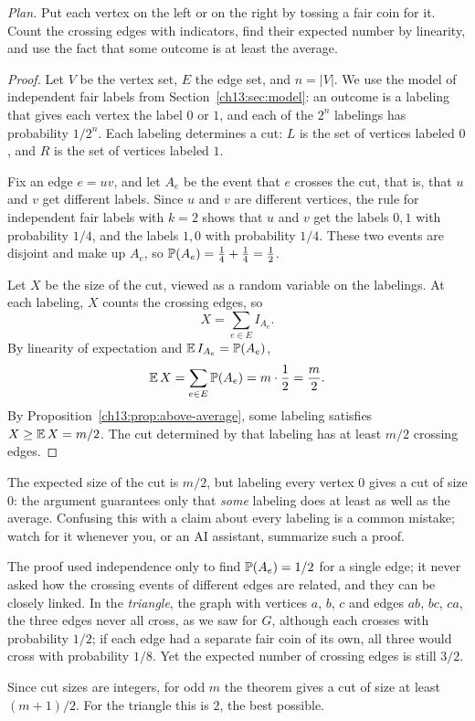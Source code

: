 \noindent\textit{Plan.} Put each vertex on the left or on the right by tossing a fair coin for it. Count the crossing edges with indicators, find their expected number by linearity, and use the fact that some outcome is at least the average.
\begin{proof}
Let $V$ be the vertex set, $E$ the edge set, and $n=|V|$. We use the model of independent fair labels from Section~\ref{ch13:sec:model}: an outcome is a labeling that gives each vertex the label $0$ or $1$, and each of the $2^n$ labelings has probability $1/2^n$. Each labeling determines a cut: $L$ is the set of vertices labeled $0$, and $R$ is the set of vertices labeled $1$.

Fix an edge $e=uv$, and let $A_e$ be the event that $e$ crosses the cut, that is, that $u$ and $v$ get different labels. Since $u$ and $v$ are different vertices, the rule for independent fair labels with $k=2$ shows that $u$ and $v$ get the labels $0,1$ with probability $1/4$, and the labels $1,0$ with probability $1/4$. These two events are disjoint and make up $A_e$, so $\operatorname{\mathbb P}(A_e)=\tfrac14+\tfrac14=\tfrac12$.

Let $X$ be the size of the cut, viewed as a random variable on the labelings. At each labeling, $X$ counts the crossing edges, so
\[
X=\sum_{e\in E}I_{A_e}.
\]
By linearity of expectation and $\operatorname{\mathbb E} I_{A_e}=\operatorname{\mathbb P}(A_e)$,
\[
\operatorname{\mathbb E} X=\sum_{e\in E}\operatorname{\mathbb P}(A_e)=m\cdot\frac12=\frac m2.
\]
By Proposition~\ref{ch13:prop:above-average}, some labeling satisfies $X\ge\operatorname{\mathbb E} X=m/2$. The cut determined by that labeling has at least $m/2$ crossing edges.
\end{proof}

The expected size of the cut is $m/2$, but labeling every vertex $0$ gives a cut of size $0$: the argument guarantees only that \emph{some} labeling does at least as well as the average. Confusing this with a claim about every labeling is a common mistake; watch for it whenever you, or an AI assistant, summarize such a proof.

The proof used independence only to find $\operatorname{\mathbb P}(A_e)=1/2$ for a single edge; it never asked how the crossing events of different edges are related, and they can be closely linked. In the \emph{triangle}, the graph with vertices $a$, $b$, $c$ and edges $ab$, $bc$, $ca$, the three edges never all cross, as we saw for $G$, although each crosses with probability $1/2$; if each edge had a separate fair coin of its own, all three would cross with probability $1/8$. Yet the expected number of crossing edges is still $3/2$.

Since cut sizes are integers, for odd $m$ the theorem gives a cut of size at least $(m+1)/2$. For the triangle this is $2$, the best possible.
